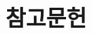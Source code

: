 \documentclass[10pt,a4paper,notitlepage]{report}
\begin{document}


\begin{multicols*}{2}
  
  
  
\end{multicols*}

\newpage
\section{참고문헌}

\end{document}
